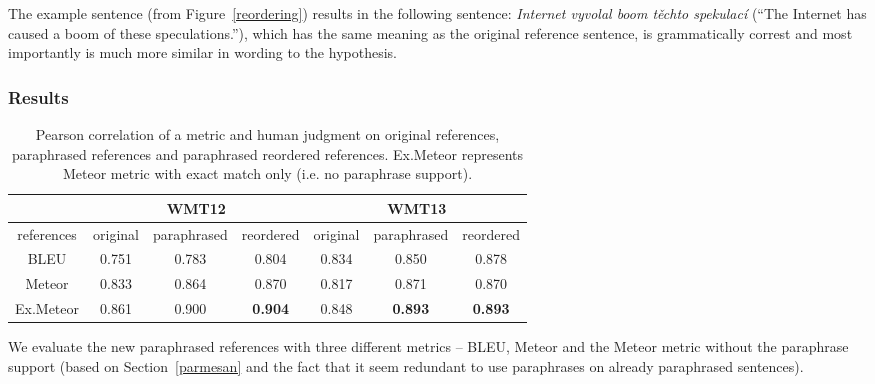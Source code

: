 \documentclass[11pt]{article}
\def\Fref#1{Figure~\ref{#1}}
\def\Sref#1{Section~\ref{#1}}
\begin{document}
The example sentence (from \Fref{reordering}) results in the following sentence:
\textit{Internet vyvolal boom těchto spekulací} (``The Internet has caused a boom 
of these speculations.''), which has the same meaning as the original reference 
sentence, is grammatically correst and most importantly is much more similar in
wording to the hypothesis.


\subsubsection{Results}
\begin{table}[tb]
\begin{center}


\begin{tabular}{|c|ccc|ccc|}
\hline
\multicolumn{1}{|l|}{} & \multicolumn{3}{c|}{\textbf{WMT12}}   & \multicolumn{3}{c|}{\textbf{WMT13}}  \\ 
\hline
references             & original & paraphrased & reordered & original & paraphrased & reordered \\ 
\hline
BLEU                   & 0.751    & 0.783       & 0.804     & 0.834    & 0.850       & 0.878   \\  %
Meteor                 & 0.833    & 0.864       & 0.870     & 0.817    & 0.871       & 0.870   \\  %
Ex.Meteor              & 0.861    & 0.900  & \textbf{0.904} & 0.848  & \textbf{0.893} & \textbf{0.893}\\  %
\hline
\end{tabular}
\caption{Pearson correlation of a metric and human judgment on original 
references, paraphrased references and paraphrased reordered references. 
Ex.Meteor represents Meteor metric with exact match only (i.e. no paraphrase
support).}
\label{results:treex}
\end{center}
\end{table}

We evaluate the new paraphrased references with three different metrics -- BLEU, 
Meteor and the Meteor metric without the paraphrase support (based on \Sref{parmesan} 
and the fact that it seem redundant to use paraphrases on already paraphrased 
sentences). 
\end{document}
